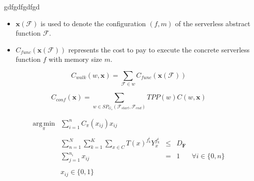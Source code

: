 gdfgdfgdfgd

\begin{itemize}
	\item $\textbf{x}(\mathscr{F})$ is used to denote the configuration $\left( f, m \right) $ of the serverless abstract function $\mathscr{F}$.
	\item $C_{func}(\textbf{x}(\mathscr{F}))$ represents the cost to pay to execute the concrete serverless function $f$ with memory size $m$.
\end{itemize}



\begin{equation}
	C_{walk}(w, \textbf{x}) = \sum_{\mathscr{F} \in w} C_{func}(\textbf{x}(\mathscr{F}))
\end{equation}


\begin{equation}
	C_{conf}(\textbf{x}) = \sum_{w \in SP_{G_s}(\mathscr{F}_{start}, \mathscr{F}_{end})} TPP(w) C(w, \textbf{x})
\end{equation}


\begin{equation}
\begin{array} {lllrrr} 
\displaystyle \operatorname*{arg\,min}_\pi & \displaystyle\sum_{i = 1}^n C_{\pi}(x_{ij})x_{ij} \\\\
& \displaystyle\sum_{n = 1}^N \sum_{k = 1}^K \sum_{x \in C} T(x)^{f_k^i} Y_x^{f_k^i} & \leq &  D_{\textbf{F}} \\
& \displaystyle\sum_{j = 1}^{n_i} x_{ij} & = & 1 & \forall i \in \lbrace 0, n \rbrace \\\\
& x_{ij} \in \lbrace 0, 1 \rbrace &&
\end{array}
\end{equation}
















